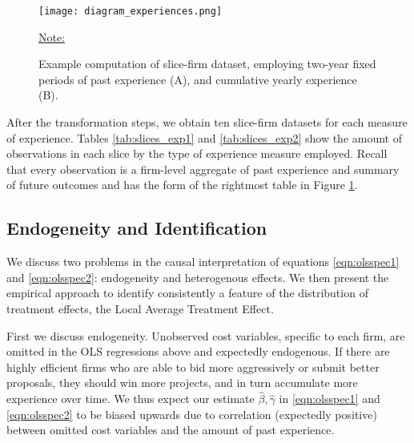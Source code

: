 \begin{figure}
  \texttt{[image: diagram\_experiences.png]}
  \caption{Example computation of slice-firm dataset, employing two-year fixed periods of past experience (A), and cumulative yearly experience (B).}
  \label{fig:diagram_experience}
  \vskip 0.5mm
  { \footnotesize \underline{Note:} }
\end{figure}


After the transformation steps, we obtain ten slice-firm datasets for each measure of experience. Tables \ref{tab:slices_exp1} and \ref{tab:slices_exp2} show the amount of observations in each slice by the type of experience measure employed. Recall that every observation is a firm-level aggregate of past experience and summary of future outcomes and has the form of the rightmost table in Figure \ref{fig:diagram_experience}.








\subsection{Endogeneity and Identification}
We discuss two problems in the causal interpretation of equations \ref{eqn:olsspec1} and \ref{eqn:olsspec2}: endogeneity and heterogenous effects. We then present the empirical approach to identify consistently a feature of the distribution of treatment effects, the Local Average Treatment Effect.

First we discuss endogeneity. Unobserved cost variables, specific to each firm, are omitted in the OLS regressions above and expectedly endogenous. If there are highly efficient firms who are able to bid more aggressively or submit better proposals, they should win more projects, and in turn accumulate more experience over time. We thus expect our estimate $\hat{\beta},\hat{\gamma}$ in \ref{eqn:olsspec1} and \ref{eqn:olsspec2} to be biased upwards due to correlation (expectedly positive) between omitted cost variables and the amount of past experience.

